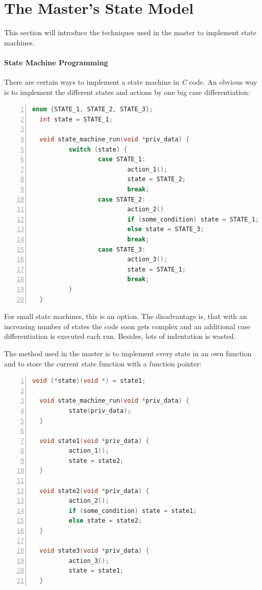 \documentclass[a4paper,12pt,BCOR6mm,bibtotoc,idxtotoc]{scrbook}
\begin{document}

\section{The Master's State Model}
\label{sec:statemodel}

This section will introduce the techniques used in the master to
implement state machines.

\paragraph{State Machine Programming}

There are certain ways to implement a state machine in \textit{C}
code. An obvious way is to implement the different states and actions
by one big case differentiation:

\begin{lstlisting}[gobble=2,language=C,numbers=left]
  enum {STATE_1, STATE_2, STATE_3};
  int state = STATE_1;

  void state_machine_run(void *priv_data) {
          switch (state) {
                  case STATE_1:
                          action_1();
                          state = STATE_2;
                          break;
                  case STATE_2:
                          action_2()
                          if (some_condition) state = STATE_1;
                          else state = STATE_3;
                          break;
                  case STATE_3:
                          action_3();
                          state = STATE_1;
                          break;
          }
  }
\end{lstlisting}

For small state machines, this is an option. The disadvantage is, that
with an increasing number of states the code soon gets complex and an
additional case differentiation is executed each run. Besides, lots of
indentation is wasted.

The method used in the master is to implement every state in an own
function and to store the current state function with a function
pointer:

\begin{lstlisting}[gobble=2,language=C,numbers=left]
  void (*state)(void *) = state1;

  void state_machine_run(void *priv_data) {
          state(priv_data);
  }

  void state1(void *priv_data) {
          action_1();
          state = state2;
  }

  void state2(void *priv_data) {
          action_2();
          if (some_condition) state = state1;
          else state = state2;
  }

  void state3(void *priv_data) {
          action_3();
          state = state1;
  }
\end{lstlisting}
\end{document}
